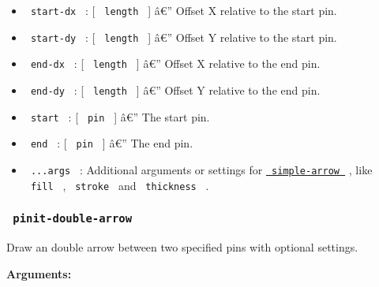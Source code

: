 \begin{itemize}
\tightlist
\item
  \texttt{\ start-dx\ } : {[} \texttt{\ length\ } {]} â€'' Offset X
  relative to the start pin.
\item
  \texttt{\ start-dy\ } : {[} \texttt{\ length\ } {]} â€'' Offset Y
  relative to the start pin.
\item
  \texttt{\ end-dx\ } : {[} \texttt{\ length\ } {]} â€'' Offset X
  relative to the end pin.
\item
  \texttt{\ end-dy\ } : {[} \texttt{\ length\ } {]} â€'' Offset Y
  relative to the end pin.
\item
  \texttt{\ start\ } : {[} \texttt{\ pin\ } {]} â€'' The start pin.
\item
  \texttt{\ end\ } : {[} \texttt{\ pin\ } {]} â€'' The end pin.
\item
  \texttt{\ ...args\ } : Additional arguments or settings for
  \href{https://github.com/typst/packages/raw/main/packages/preview/pinit/0.2.2/\#simple-arrow}{\texttt{\ simple-arrow\ }}
  , like \texttt{\ fill\ } , \texttt{\ stroke\ } and
  \texttt{\ thickness\ } .
\end{itemize}

\subsubsection{\texorpdfstring{\texttt{\ pinit-double-arrow\ }}{ pinit-double-arrow }}\label{pinit-double-arrow}

Draw an double arrow between two specified pins with optional settings.

\begin{Shaded}
\begin{Highlighting}[]
\end{Highlighting}
\end{Shaded}

\textbf{Arguments:}

